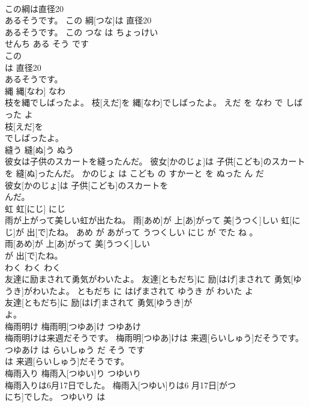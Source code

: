 \documentclass[8pt]{extreport}
\begin{document}
\begin{CJK}{UTF8}{min}
\\	この綱は直径20
\\	あるそうです。	この 綱[つな]は 直径20
\\	[ちょっけい 
\\	せんち]あるそうです。	この つな は ちょっけい 
\\	せんち ある そう です	
\\	この
\\	は 直径20
\\	[ちょっけい 
\\	せんち]あるそうです。			
\\	縄	縄[なわ]	なわ	
\\	枝を縄でしばったよ。	枝[えだ]を 縄[なわ]でしばったよ。	えだ を なわ で しばった よ	
\\	枝[えだ]を
\\	でしばったよ。			
\\	縫う	縫[ぬ]う	ぬう	
\\	彼女は子供のスカートを縫ったんだ。	彼女[かのじょ]は 子供[こども]のスカートを 縫[ぬ]ったんだ。	かのじょ は こども の すかーと を ぬった ん だ	
\\	彼女[かのじょ]は 子供[こども]のスカートを
\\	んだ。			
\\	虹	虹[にじ]	にじ	
\\	雨が上がって美しい虹が出たね。	雨[あめ]が 上[あ]がって 美[うつく]しい 虹[にじ]が 出[で]たね。	あめ が あがって うつくしい にじ が でた ね 。	
\\	雨[あめ]が 上[あ]がって 美[うつく]しい
\\	が 出[で]たね。			
\\	わく	わく	わく	
\\	友達に励まされて勇気がわいたよ。	友達[ともだち]に 励[はげ]まされて 勇気[ゆうき]がわいたよ。	ともだち に はげまされて ゆうき が わいた よ	
\\	友達[ともだち]に 励[はげ]まされて 勇気[ゆうき]が
\\	よ。			
\\	梅雨明け	梅雨明[つゆあ]け	つゆあけ	
\\	梅雨明けは来週だそうです。	梅雨明[つゆあ]けは 来週[らいしゅう]だそうです。	つゆあけ は らいしゅう だ そう です	
\\	は 来週[らいしゅう]だそうです。			
\\	梅雨入り	梅雨入[つゆい]り	つゆいり	
\\	梅雨入りは6月17日でした。	梅雨入[つゆい]りは6 月17日[がつ 
\\	にち]でした。	つゆいり は 

\end{CJK}
\end{document}
